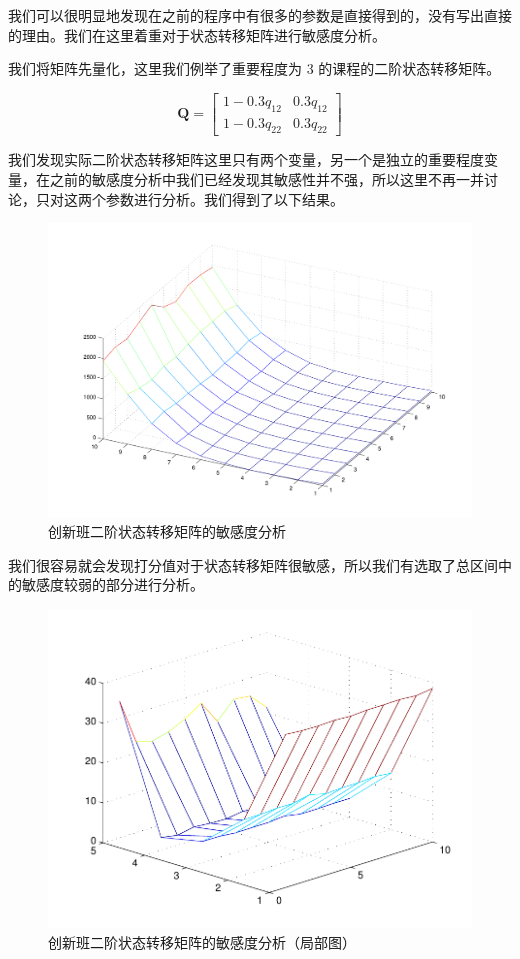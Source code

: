 \documentclass[a4paper]{article}
\let\mat\boldsymbol %
\begin{document}
  我们可以很明显地发现在之前的程序中有很多的参数是直接得到的，没有写出直接的理由。我们在这里着重对于状态转移矩阵进行敏感度分析。

  我们将矩阵先量化，这里我们例举了重要程度为 3 的课程的二阶状态转移矩阵。

  \begin{equation}
  \mat{Q}=
  \begin{bmatrix}
  1-0.3q_{12} & 0.3q_{12} \\
  1-0.3q_{22} & 0.3q_{22}
  \end{bmatrix}
  \end{equation}

  我们发现实际二阶状态转移矩阵这里只有两个变量，另一个是独立的重要程度变量，在之前的敏感度分析中我们已经发现其敏感性并不强，所以这里不再一并讨论，只对这两个参数进行分析。我们得到了以下结果。

  \begin{figure}[H]
  \centerline{\includegraphics[scale=0.5]{inno2.pdf}}
  \caption{创新班二阶状态转移矩阵的敏感度分析}
  \end{figure}

  我们很容易就会发现打分值对于状态转移矩阵很敏感，所以我们有选取了总区间中的敏感度较弱的部分进行分析。

  \begin{figure}[H]
  \centerline{\includegraphics[scale=0.7]{inno2part.pdf}}
  \caption{创新班二阶状态转移矩阵的敏感度分析（局部图）}
  \end{figure}
\end{document}
